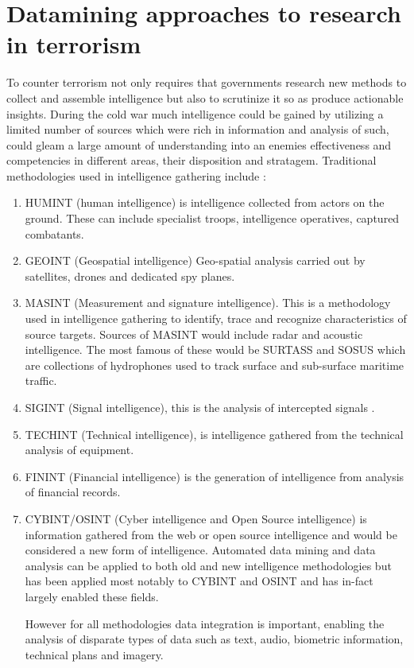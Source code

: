 \chapter[Datamining and statistical approaches to research in terrorism and counter terrorism]{Datamining approaches to research in terrorism}

To counter terrorism not only requires that governments research new methods to collect and assemble intelligence but also to scrutinize it so as produce actionable insights. During the cold war much intelligence could be gained by utilizing a limited number of sources which were rich in information and analysis of such, could gleam a large amount of understanding into an enemies effectiveness and competencies in different areas, their disposition and stratagem. Traditional methodologies used in intelligence gathering include \citep{tanner2014examining}:
\begin{enumerate}
\item HUMINT (human intelligence) is intelligence collected from actors on the ground. These can include specialist troops, intelligence operatives, captured combatants.
\item GEOINT (Geospatial intelligence) Geo-spatial analysis carried out by satellites, drones and dedicated spy planes.
\item MASINT (Measurement and signature intelligence). This is a methodology  used in intelligence gathering to identify, trace and recognize characteristics of source targets. Sources of MASINT would include radar and acoustic intelligence. The most famous of these would be SURTASS and SOSUS \citep{noles2003judge} which are collections of hydrophones used to track surface and sub-surface maritime traffic.
\item SIGINT (Signal intelligence), this is the analysis of intercepted signals \citep{aid2003all}.
\item TECHINT (Technical intelligence), is intelligence gathered from the technical analysis of equipment.
\item FININT  (Financial intelligence) is the generation of intelligence from analysis of financial records.
\item CYBINT/OSINT (Cyber intelligence and Open Source intelligence) \citep{csahinnew} is information gathered from the web or open source intelligence and would be considered a new form of intelligence. Automated data mining and data analysis can be applied to both old and new intelligence methodologies but has been applied most notably to CYBINT and OSINT and has in-fact largely enabled these fields.

However for all methodologies data integration is important, enabling the analysis of disparate types of data such as text, audio, biometric information, technical plans and imagery.
\end{enumerate}


